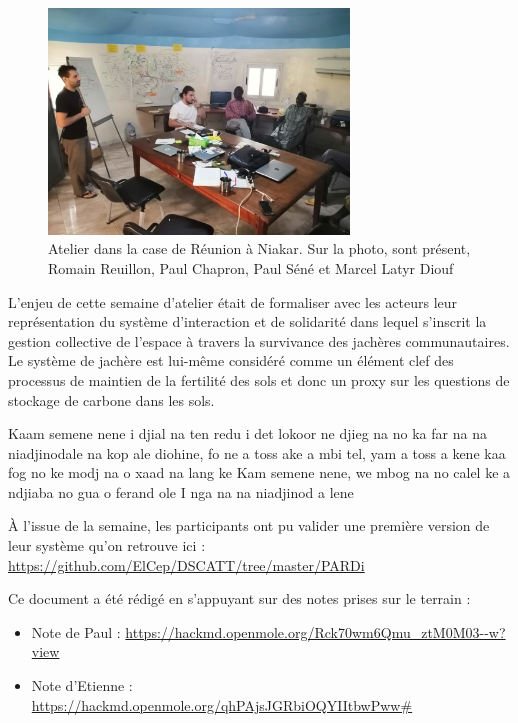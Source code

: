   \begin{figure}
    \begin{center}
      \includegraphics[width=8cm]{img/atelier_niakhar.jpg}
    \end{center}
    \caption{Atelier dans la case de Réunion à Niakar. Sur la photo, sont présent, Romain Reuillon, Paul Chapron, Paul Séné et Marcel Latyr Diouf}
    \label{fig:photoAtelier}
  \end{figure}

\begin{paracol}{2}

  L'enjeu de cette semaine d'atelier était de formaliser avec les acteurs leur représentation du système d'interaction et de solidarité dans lequel s'inscrit la gestion collective de l'espace à travers la survivance des jachères communautaires. Le système de jachère est lui-même considéré comme un élément clef des processus de maintien de la fertilité des sols et donc un proxy sur les questions de stockage de carbone dans les sols.

  \switchcolumn %

  Kaam semene nene i djial na ten redu i det lokoor ne djieg na no ka far na na niadjinodale na kop ale diohine, fo ne a toss ake a mbi tel, yam a toss a kene kaa fog no ke modj na o xaad na lang ke
  Kam semene nene, we mbog na no calel ke a ndjiaba no gua o ferand ole I nga na na niadjinod a lene

\end{paracol}

  À l'issue de la semaine, les participants ont pu valider une première version de leur système qu'on retrouve ici : \url{https://github.com/ElCep/DSCATT/tree/master/PARDi}

  Ce document a été rédigé en s'appuyant sur des notes prises sur le terrain :
  \begin{itemize}
    \item Note de Paul : \url{https://hackmd.openmole.org/Rck70wm6Qmu_ztM0M03--w?view}
    \item Note d'Etienne : \url{https://hackmd.openmole.org/qhPAjsJGRbiOQYIItbwPww#}
  \end{itemize}



